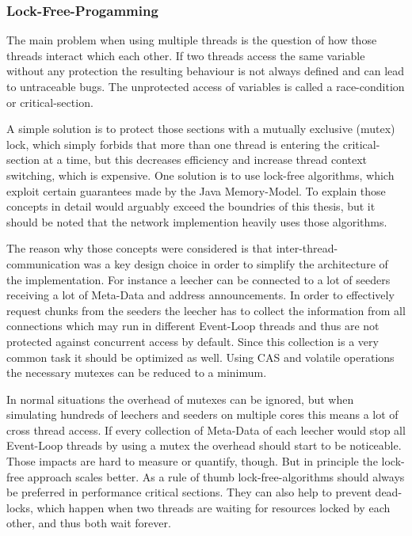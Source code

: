 \subsubsection{Lock-Free-Progamming}
\label{subsecsec:lockfree}
The main problem when using multiple threads is the question of how those threads interact which each other. If two threads access the same variable without any protection the resulting behaviour is not always defined and can lead to untraceable bugs. The unprotected access of variables is called a race-condition or critical-section.

A simple solution is to protect those sections with a mutually exclusive (mutex) lock, which simply forbids that more than one thread is entering the critical-section at a time, but this decreases efficiency and increase thread context switching, which is expensive. One solution is to use lock-free algorithms, which exploit certain guarantees made by the Java Memory-Model. To explain those concepts in detail would arguably exceed the boundries of this thesis, but it should be noted that the network implemention heavily uses those algorithms.

The reason why those concepts were considered is that inter-thread-communication was a key design choice in order to simplify the architecture of the implementation. For instance a leecher can be connected to a lot of seeders receiving a lot of Meta-Data and address announcements. In order to effectively request chunks from the seeders the leecher has to collect the information from all connections which may run in different Event-Loop threads and thus are not protected against concurrent access by default. Since this collection is a very common task it should be optimized as well. Using CAS and volatile operations the necessary mutexes can be reduced to a minimum. 

In normal situations the overhead of mutexes can be ignored, but when simulating hundreds of leechers and seeders on multiple cores this means a lot of cross thread access. If every collection of Meta-Data of each leecher would stop all Event-Loop threads by using a mutex the overhead should start to be noticeable. Those impacts are hard to measure or quantify, though. But in principle the lock-free approach scales better. As a rule of thumb lock-free-algorithms should always be preferred in performance critical sections. They can also help to prevent dead-locks, which happen when two threads are waiting for resources locked by each other, and thus both wait forever.

